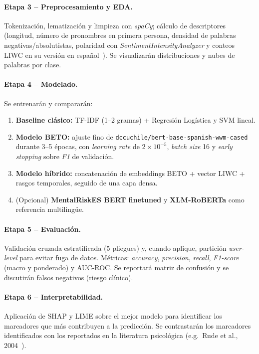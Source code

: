 \documentclass[12pt,a4paper,spanish]{article}
\begin{document}
\paragraph{Etapa 3 -- Preprocesamiento y EDA.} Tokenización, lematización y limpieza con \emph{spaCy}; cálculo de descriptores (longitud, número de pronombres en primera persona, densidad de palabras negativas/absolutistas, polaridad con \emph{SentimentIntensityAnalyzer} y conteos LIWC en su versión en español~\cite{leis2019tesis}). Se visualizarán distribuciones y nubes de palabras por clase.

\paragraph{Etapa 4 -- Modelado.} Se entrenarán y compararán:
\begin{enumerate}[leftmargin=2em]
    \item \textbf{Baseline clásico:} TF-IDF (1--2 gramas) + Regresión Logística y SVM lineal.
    \item \textbf{Modelo BETO:} ajuste fino de \texttt{dccuchile/bert-base-spanish-wwm-cased}~\cite{betohf} durante 3--5 épocas, con \emph{learning rate} de $2\!\times\!10^{-5}$, \emph{batch size} 16 y \emph{early stopping} sobre \emph{F1} de validación.
    \item \textbf{Modelo híbrido:} concatenación de embeddings BETO + vector LIWC + rasgos temporales, seguido de una capa densa.
    \item (Opcional) \textbf{MentalRiskES BERT finetuned} y \textbf{XLM-RoBERTa} como referencia multilingüe.
\end{enumerate}

\paragraph{Etapa 5 -- Evaluación.} Validación cruzada estratificada (5 pliegues) y, cuando aplique, partición \emph{user-level} para evitar fuga de datos. Métricas: \emph{accuracy}, \emph{precision}, \emph{recall}, \emph{F1-score} (macro y ponderado) y AUC-ROC. Se reportará matriz de confusión y se discutirán falsos negativos (riesgo clínico).

\paragraph{Etapa 6 -- Interpretabilidad.} Aplicación de SHAP y LIME sobre el mejor modelo para identificar los marcadores que más contribuyen a la predicción. Se contrastarán los marcadores identificados con los reportados en la literatura psicológica (e.g.\ Rude et al., 2004~\cite{aisel2023mentalbert}).
\end{document}
